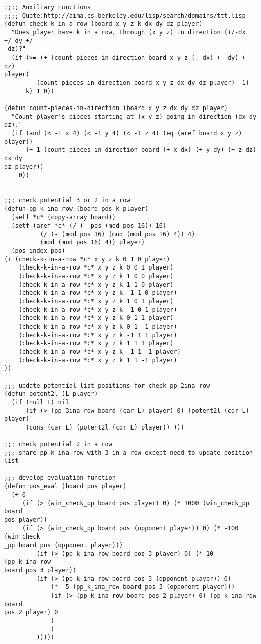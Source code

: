 \documentclass[12pt]{book}
\begin{document}
\begin{lstlisting}
;;;; Auxiliary Functions 
;;;; Quote:http://aima.cs.berkeley.edu/lisp/search/domains/ttt.lisp
(defun check-k-in-a-row (board x y z k dx dy dz player)
  "Does player have k in a row, through (x y z) in direction (+/-dx +/-dy +/
-dz)?"
  (if (>= (+ (count-pieces-in-direction board x y z (- dx) (- dy) (- dz) 
player) 
         (count-pieces-in-direction board x y z dx dy dz player) -1) 
      k) 1 0))

(defun count-pieces-in-direction (board x y z dx dy dz player)
  "Count player's pieces starting at (x y z) going in direction (dx dy dz)."
  (if (and (< -1 x 4) (< -1 y 4) (< -1 z 4) (eq (aref board x y z) player))
      (+ 1 (count-pieces-in-direction board (+ x dx) (+ y dy) (+ z dz) dx dy
dz player))
    0))


;;; check potential 3 or 2 in a row    
(defun pp_k_ina_row (board pos k player)
  (setf *c* (copy-array board))
  (setf (aref *c* (/ (- pos (mod pos 16)) 16) 
          (/ (- (mod pos 16) (mod (mod pos 16) 4)) 4) 
          (mod (mod pos 16) 4)) player)
  (pos_index pos)
(+ (check-k-in-a-row *c* x y z k 0 1 0 player)
    (check-k-in-a-row *c* x y z k 0 0 1 player)
    (check-k-in-a-row *c* x y z k 1 0 0 player)
    (check-k-in-a-row *c* x y z k 1 1 0 player)
    (check-k-in-a-row *c* x y z k -1 1 0 player)
    (check-k-in-a-row *c* x y z k 1 0 1 player)
    (check-k-in-a-row *c* x y z k -1 0 1 player)
    (check-k-in-a-row *c* x y z k 0 1 1 player)
    (check-k-in-a-row *c* x y z k 0 1 -1 player)
    (check-k-in-a-row *c* x y z k -1 1 1 player)
    (check-k-in-a-row *c* x y z k 1 1 1 player)
    (check-k-in-a-row *c* x y z k -1 1 -1 player)
    (check-k-in-a-row *c* x y z k 1 1 -1 player)
))

;;; update potential list positions for check pp_2ina_row
(defun potent2l (L player)
  (if (null L) nil
      (if (> (pp_3ina_row board (car L) player) 0) (potent2l (cdr L) player)
      (cons (car L) (potent2l (cdr L) player)) )))

;;; check potential 2 in a row
;;; share pp_k_ina_row with 3-in-a-row except need to update position list

;;; develop evaluation function
(defun pos_eval (board pos player)
  (+ 0
     (if (> (win_check_pp board pos player) 0) (* 1000 (win_check_pp board 
pos player))
     (if (> (win_check_pp board pos (opponent player)) 0) (* -100 (win_check
_pp board pos (opponent player)))
         (if (> (pp_k_ina_row board pos 3 player) 0) (* 10 (pp_k_ina_row 
board pos 3 player))
         (if (> (pp_k_ina_row board pos 3 (opponent player)) 0) 
             (* -5 (pp_k_ina_row board pos 3 (opponent player)))
             (if (> (pp_k_ina_row board pos 2 player) 0) (pp_k_ina_row board
pos 2 player) 0
             )
             )
         )))))


\end{lstlisting}
\end{document}
